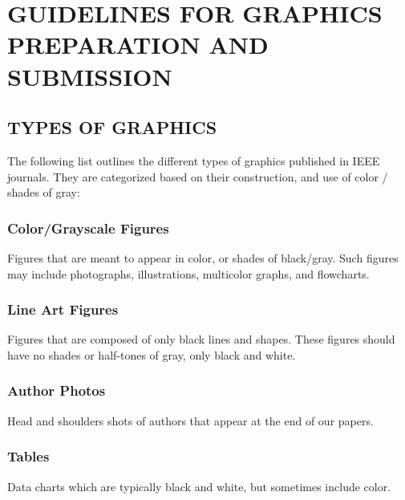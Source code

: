 \section{GUIDELINES FOR GRAPHICS PREPARATION AND SUBMISSION}
\subsection{TYPES OF GRAPHICS}
The following list outlines the different types of graphics published in 
IEEE journals. They are categorized based on their construction, and use of 
color / shades of gray:

\subsubsection{Color/Grayscale Figures}
Figures that are meant to appear in color, or shades of black/gray. Such 
figures may include photographs, illustrations, multicolor graphs, and 
flowcharts.

\subsubsection{Line Art Figures}
Figures that are composed of only black lines and shapes. These figures 
should have no shades or half-tones of gray, only black and white.

\subsubsection{Author Photos}
Head and shoulders shots of authors that appear at the end of our papers. 

\subsubsection{Tables}
Data charts which are typically black and white, but sometimes include 
color.

